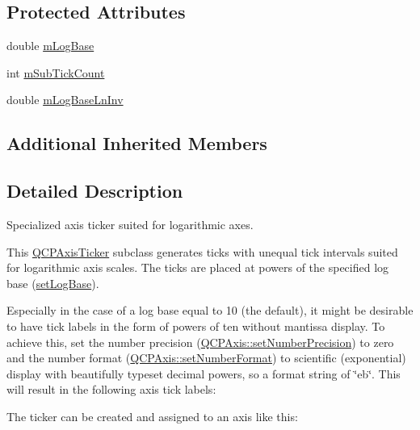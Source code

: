 \subsection*{Protected Attributes}
\begin{DoxyCompactItemize}
\item 
double \hyperlink{class_q_c_p_axis_ticker_log_a4108bcc1cd68dcec54dc75667440d328}{m\+Log\+Base}
\item 
int \hyperlink{class_q_c_p_axis_ticker_log_a3d92b729bedbbbd34ee5f74565defd95}{m\+Sub\+Tick\+Count}
\item 
double \hyperlink{class_q_c_p_axis_ticker_log_aeba719bbeec39957f475ef89d6ae2fe7}{m\+Log\+Base\+Ln\+Inv}
\end{DoxyCompactItemize}
\subsection*{Additional Inherited Members}


\subsection{Detailed Description}
Specialized axis ticker suited for logarithmic axes. 



This \hyperlink{class_q_c_p_axis_ticker}{Q\+C\+P\+Axis\+Ticker} subclass generates ticks with unequal tick intervals suited for logarithmic axis scales. The ticks are placed at powers of the specified log base (\hyperlink{class_q_c_p_axis_ticker_log_ac6e3b4e03baea3816f898869ab9751ef}{set\+Log\+Base}).

Especially in the case of a log base equal to 10 (the default), it might be desirable to have tick labels in the form of powers of ten without mantissa display. To achieve this, set the number precision (\hyperlink{class_q_c_p_axis_a21dc8023ad7500382ad9574b48137e63}{Q\+C\+P\+Axis\+::set\+Number\+Precision}) to zero and the number format (\hyperlink{class_q_c_p_axis_ae585a54dc2aac662e90a2ca82f002590}{Q\+C\+P\+Axis\+::set\+Number\+Format}) to scientific (exponential) display with beautifully typeset decimal powers, so a format string of {\ttfamily \char`\"{}eb\char`\"{}}. This will result in the following axis tick labels\+:



The ticker can be created and assigned to an axis like this\+: 
\begin{DoxyCodeInclude}
\end{DoxyCodeInclude}


